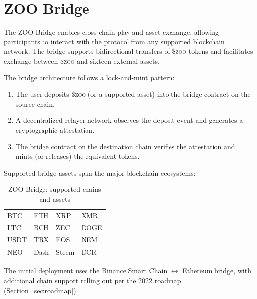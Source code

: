 \documentclass[11pt,letterpaper]{article}
\newcommand{\ZOO}{\$\textsc{zoo}}
\begin{document}
\section{ZOO Bridge}
\label{sec:bridge}

The ZOO Bridge enables cross-chain play and asset exchange, allowing participants to
interact with the protocol from any supported blockchain network.  The bridge supports
bidirectional transfers of \ZOO{} tokens and facilitates exchange between \ZOO{} and
sixteen external assets.

The bridge architecture follows a lock-and-mint pattern:

\begin{enumerate}
    \item The user deposits \ZOO{} (or a supported asset) into the bridge contract on
          the source chain.
    \item A decentralized relayer network observes the deposit event and generates a
          cryptographic attestation.
    \item The bridge contract on the destination chain verifies the attestation and mints
          (or releases) the equivalent tokens.
\end{enumerate}

Supported bridge assets span the major blockchain ecosystems:

\begin{table}[ht]
\centering
\caption{ZOO Bridge: supported chains and assets}
\label{tab:bridge}
\begin{tabular}{llll}
\toprule
BTC & ETH & XRP & XMR \\
LTC & BCH & ZEC & DOGE \\
USDT & TRX & EOS & NEM \\
NEO & Dash & Steem & DCR \\
\bottomrule
\end{tabular}
\end{table}

The initial deployment uses the Binance Smart Chain $\leftrightarrow$ Ethereum bridge,
with additional chain support rolling out per the 2022 roadmap (Section~\ref{sec:roadmap}).
\end{document}
